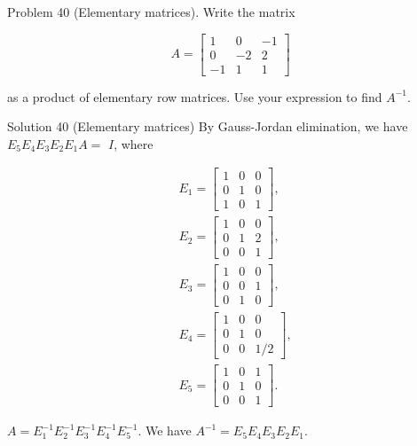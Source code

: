 \documentclass[10pt]{article}
\begin{document}
Problem 40 (Elementary matrices). Write the matrix

$$
A=\left[\begin{array}{ccc}
1 & 0 & -1 \\
0 & -2 & 2 \\
-1 & 1 & 1
\end{array}\right]
$$

as a product of elementary row matrices. Use your expression to find $A^{-1}$.

Solution 40 (Elementary matrices) By Gauss-Jordan elimination, we have $E_{5} E_{4} E_{3} E_{2} E_{1} A=$ $I$, where

$$
\begin{aligned}
& E_{1}=\left[\begin{array}{lll}
1 & 0 & 0 \\
0 & 1 & 0 \\
1 & 0 & 1
\end{array}\right], \\
& E_{2}=\left[\begin{array}{lll}
1 & 0 & 0 \\
0 & 1 & 2 \\
0 & 0 & 1
\end{array}\right], \\
& E_{3}=\left[\begin{array}{lll}
1 & 0 & 0 \\
0 & 0 & 1 \\
0 & 1 & 0
\end{array}\right], \\
& E_{4}=\left[\begin{array}{ccc}
1 & 0 & 0 \\
0 & 1 & 0 \\
0 & 0 & 1 / 2
\end{array}\right], \\
& E_{5}=\left[\begin{array}{lll}
1 & 0 & 1 \\
0 & 1 & 0 \\
0 & 0 & 1
\end{array}\right] .
\end{aligned}
$$

$A=E_{1}^{-1} E_{2}^{-1} E_{3}^{-1} E_{4}^{-1} E_{5}^{-1}$. We have $A^{-1}=E_{5} E_{4} E_{3} E_{2} E_{1}$.
\end{document}
